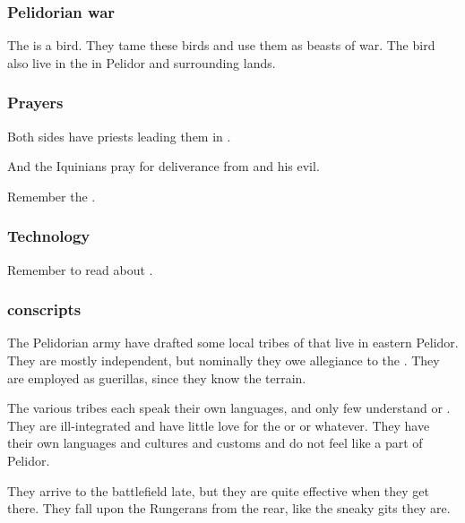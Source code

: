 \subsubsection{Pelidorian war \grulcans}
The  is a  bird. 
They tame these birds and use them as beasts of war. 
The bird also live in the \wylde in Pelidor and surrounding lands. 





\subsubsection{Prayers}
Both sides have priests leading them in . 

And the Iquinians pray for deliverance from  and his evil.

Remember the . 





\subsubsection{Technology}
Remember to read about . 





\subsubsection{\Meccaran conscripts}
The Pelidorian army have drafted some local tribes of \meccara{} that live in eastern Pelidor. 
They are mostly independent, but nominally they owe allegiance to the \rayuth. 
They are employed as guerillas, since they know the terrain. 

The various tribes each speak their own languages, and only few understand \Velcadian{} or \Tepharin. 
They are ill-integrated and have little love for the \rayuth or \rinyuth or whatever. 
They have their own languages and cultures and customs and do not feel like a part of Pelidor. 

They arrive to the battlefield late, but they are quite effective when they get there. 
They fall upon the Rungerans from the rear, like the sneaky gits they are. 





